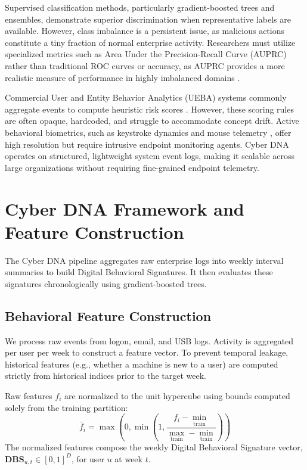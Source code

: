 \documentclass[pdflatex,sn-mathphys-num]{sn-jnl}
\theoremstyle{thmstyleone}
\theoremstyle{thmstyletwo}
\theoremstyle{thmstylethree}
\begin{document}
Supervised classification methods, particularly gradient-boosted trees and ensembles, demonstrate superior discrimination when representative labels are available. However, class imbalance is a persistent issue, as malicious actions constitute a tiny fraction of normal enterprise activity. Researchers must utilize specialized metrics such as Area Under the Precision-Recall Curve (AUPRC) rather than traditional ROC curves or accuracy, as AUPRC provides a more realistic measure of performance in highly imbalanced domains \cite{lindauer2014generating}.

Commercial User and Entity Behavior Analytics (UEBA) systems commonly aggregate events to compute heuristic risk scores \cite{homoliak2019insight}. However, these scoring rules are often opaque, hardcoded, and struggle to accommodate concept drift. Active behavioral biometrics, such as keystroke dynamics and mouse telemetry \cite{alsulami2018biometric, broderick2013active}, offer high resolution but require intrusive endpoint monitoring agents. Cyber DNA operates on structured, lightweight system event logs, making it scalable across large organizations without requiring fine-grained endpoint telemetry.

\section{Cyber DNA Framework and Feature Construction}\label{sec3}
The Cyber DNA pipeline aggregates raw enterprise logs into weekly interval summaries to build Digital Behavioral Signatures. It then evaluates these signatures chronologically using gradient-boosted trees.

\subsection{Behavioral Feature Construction}\label{subsec3_1}
We process raw events from logon, email, and USB logs. Activity is aggregated per user per week to construct a feature vector. To prevent temporal leakage, historical features (e.g., whether a machine is new to a user) are computed strictly from historical indices prior to the target week. 

Raw features $f_i$ are normalized to the unit hypercube using bounds computed solely from the training partition:
\begin{equation}
\bar{f}_i = \max\left(0, \min\left(1, \frac{f_i - \min_{\text{train}}}{\max_{\text{train}} - \min_{\text{train}}}\right)\right)
\label{eq:norm}
\end{equation}
The normalized features compose the weekly Digital Behavioral Signature vector, $\mathbf{DBS}_{u,t} \in [0,1]^D$, for user $u$ at week $t$.
\end{document}
